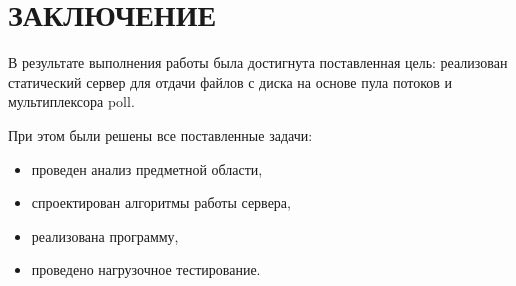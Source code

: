 \chapter*{ЗАКЛЮЧЕНИЕ}

В результате выполнения работы была достигнута поставленная цель: реализован
статический сервер для отдачи файлов с диска на основе пула потоков и мультиплексора poll. 

При этом были решены все поставленные задачи: 
\begin{itemize}
    \item проведен анализ предметной области, 
    \item спроектирован алгоритмы работы сервера, 
    \item реализована программу,
    \item проведено нагрузочное тестирование.
\end{itemize}
